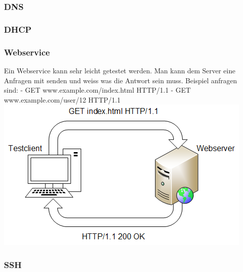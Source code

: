 \documentclass[a4,12pt]{scrartcl}
\begin{document}
\subsubsection{DNS}

\subsubsection{DHCP}

\subsubsection{Webservice}
Ein Webservice kann sehr leicht getestet werden. Man kann dem Server eine Anfragen mit senden und weiss was die Antwort sein muss.
Beispiel anfragen sind: \newline
- GET www.example.com/index.html HTTP/1.1 \newline
- GET www.example.com/user/12 HTTP/1.1 \newline
\newline
\includegraphics[scale=1]{figures/httpget.png}

\subsubsection{SSH}
\end{document}
